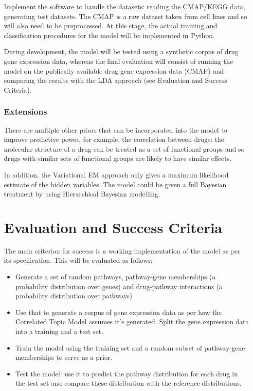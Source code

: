 \documentclass[12pt,a4]{article}
\begin{document}
Implement the software to handle the datasets: reading the CMAP/KEGG data, generating test datasets. The CMAP is a raw dataset taken from cell lines and so will also need to be preprocessed. At this stage, the actual training and classification procedures for the model will be implemented in Python. 

During development, the model will be tested using a synthetic corpus of drug gene expression data, whereas the final evaluation will consist of running the model on the publically available drug gene expression data (CMAP) and comparing the results with the LDA approach (see Evaluation and Success Criteria).

\subsubsection*{Extensions}
There are multiple other priors that can be incorporated into the model to improve predictive power, for example, the correlation between drugs: the molecular structure of a drug can be treated as a set of functional groups and so drugs with similar sets of functional groups are likely to have similar effects.

In addition, the Variational EM approach only gives a maximum likelihood estimate of the hidden variables. The model could be given a full Bayesian treatment by using Hierarchical Bayesian modelling.

\section*{Evaluation and Success Criteria}

The main criterion for success is a working implementation of the model as per its specification. This will be evaluated as follows:
\begin{itemize} 
\item Generate a set of random pathways, pathway-gene memberships (a probability distribution over genes) and drug-pathway interactions (a probability distribution over pathways)
\item Use that to generate a corpus of gene expression data as per how the Correlated Topic Model assumes it's generated. Split the gene expression data into a training and a test set.
\item Train the model using the training set and a random subset of pathway-gene memberships to serve as a prior.
\item Test the model: use it to predict the pathway distribution for each drug in the test set and compare these distribution with the reference distributions.
\end{itemize}
\end{document}
